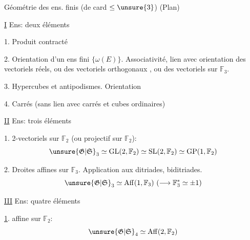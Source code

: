 
Géométrie des ens. finis (de card $\leq\unsure{3}$) \hfill (Plan)

\uline{I} Ens: deux éléments

1. Produit contracté


2. Orientation d'un ens fini $\{\omega(E)\}$. Associativité, lien avec orientation des vectoriels réels, ou des vectoriels orthogonaux , ou des vectoriels sur $\mathbb F_3$.

3. Hypercubes et antipodismes. Orientation 

4. Carrés (sans lien avec carrés et cubes ordinaires)

\uline{II} Ens: trois éléments

1. 2-vectoriels sur $\mathbb F_2$ (ou   projectif sur $\mathbb F_2$):
\[
\unsure{\mathfrak G|\mathfrak S}_3\simeq\mathrm{GL}(2,\mathbb F_2)\simeq\mathrm{SL}(2,\mathbb F_2)\simeq\mathrm{GP}(1,\mathbb F_2)
\]

2. Droites affines sur $\mathbb F_3$. Application aux ditriades, biditriades.
\[
\unsure{\mathfrak G|\mathfrak S}_3\simeq\operatorname{Aff}(1,\mathbb F_3)\ (\longrightarrow\mathbb F_3^*\simeq\pm1)
\]



\uline{III} Ens: quatre éléments

\uline{1}.   affine sur $\mathbb F_2$:
\[
\unsure{\mathfrak G|\mathfrak S}_4\simeq\operatorname{Aff}(2,\mathbb F_2)
\]

